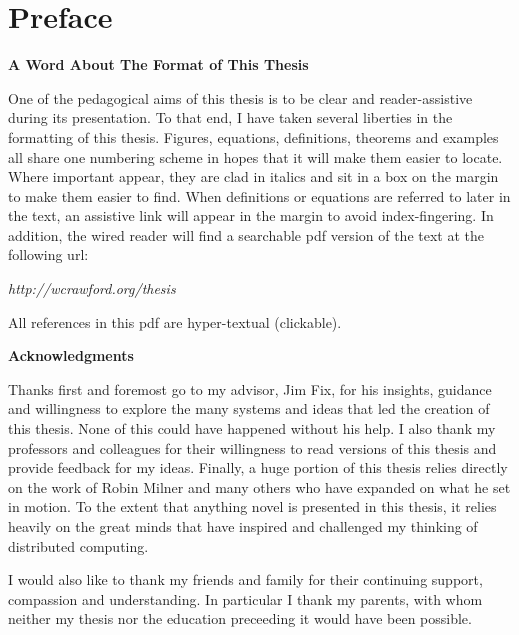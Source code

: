 \chapter*{Preface}
\vspace{5cm}
\begin{center}\textbf{A Word About The Format of This Thesis}\end{center}
One of the pedagogical aims of this thesis is to be clear and reader-assistive during its presentation.  To that end, I have taken several liberties in the formatting of this thesis.  Figures, equations, definitions, theorems and examples all share one numbering scheme in hopes that it will make them easier to locate. Where important  appear, they are clad in italics and sit in a box on the margin to make them easier to find.  When definitions or equations are referred to later in the text, an assistive link will appear in the margin to avoid index-fingering.  In addition, the wired reader will find a searchable pdf version of the text at the following url:
\begin{center}
	\emph{http://wcrawford.org/thesis}
\end{center}
All references in this pdf are hyper-textual (clickable).\\


\begin{center}\textbf{Acknowledgments}\end{center}
Thanks first and foremost go to my advisor, Jim Fix, for his insights, guidance and willingness to explore the many systems and ideas that led the creation of this thesis.  None of this could have happened without his help.  I also thank my professors and colleagues for their willingness to read versions of this thesis and provide feedback for my ideas.  Finally, a huge portion of this thesis relies directly on the work of Robin Milner and many others who have expanded on what he set in motion.  To the extent that anything novel is presented in this thesis, it relies heavily on the great minds that have inspired and challenged my thinking of distributed computing.

I would also like to thank my friends and family for their continuing support, compassion and understanding.  In particular I thank my parents, with whom neither my thesis nor the education preceeding it would have been possible.